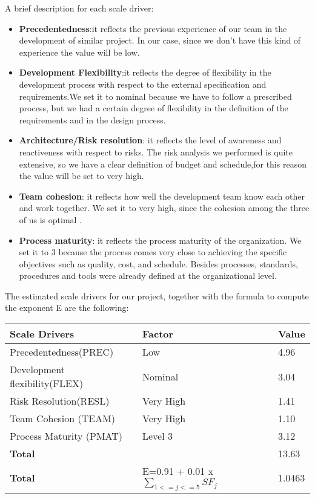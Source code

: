 A brief description for each scale driver:
\begin{itemize}
\item\textbf{Precedentedness}:it reflects the previous experience of our team in the development of similar project. In our case, since we don't have this kind of experience the value will be low. 

\item\textbf{Development Flexibility}:it reflects the degree of flexibility in the development process with respect to the external specification and requirements.We set it to nominal because we have to follow a prescribed process, but we had a certain degree of flexibility in the definition of the requirements and in the design process.

\item\textbf{Architecture/Risk resolution}: it reflects the level of awareness and reactiveness with
respect to risks. The risk analysis we performed is quite extensive, so we have a clear definition of budget and schedule,for this reason the value will be set to very high.

\item\textbf{Team cohesion}: it reflects how well the development team know each other and work together. We set it to very high, since the cohesion among the three of us is optimal .

\item\textbf{Process maturity}: it reflects the process maturity of the organization. We set it to 3 because the  process comes very close to achieving the specific objectives such as quality, cost, and schedule. Besides processes, standards, procedures and tools were already defined
at the organizational level.
\end{itemize}

The estimated scale drivers for our project, together with the formula to
compute the exponent E are the following:
\begin{longtable}{| m{6 cm}| m{6 cm} | m{2 cm} |}
\hline
\textbf{Scale Drivers} & \textbf{Factor} & \textbf{Value} \\
\hline
Precedentedness(PREC) & Low & 4.96 \\
\hline
Development flexibility(FLEX) & Nominal & 3.04 \\
\hline
Risk Resolution(RESL) & Very High & 1.41 \\
\hline
Team Cohesion (TEAM) & Very High & 1.10 \\
\hline
Process Maturity (PMAT) & Level 3 & 3.12 \\
\hline
\textbf{Total} & & 13.63\\
\hline
\textbf{Total} & E=0.91 + 0.01 x $\sum_{1<=j<=5} SF_j$ & 1.0463 \\
\hline
\end{longtable}
